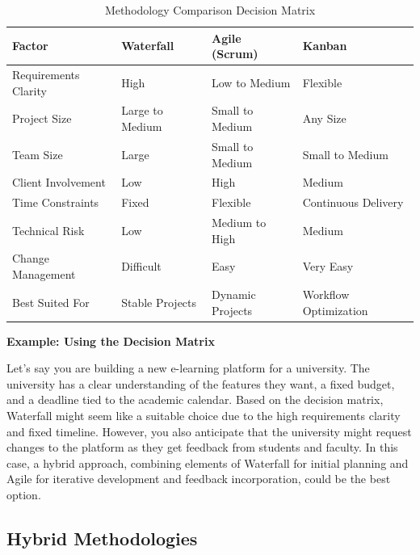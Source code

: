 \begin{table}[h!]
  \centering
  \begin{tabular}{p{3.5cm}|p{3.5cm}|p{3.5cm}|p{3.5cm}}
    \hline
    \textbf{Factor}      & \textbf{Waterfall} & \textbf{Agile (Scrum)} & \textbf{Kanban}       \\
    \hline
    Requirements Clarity & High               & Low to Medium          & Flexible              \\
    \hline
    Project Size         & Large to Medium    & Small to Medium        & Any Size              \\
    \hline
    Team Size            & Large              & Small to Medium        & Small to Medium       \\
    \hline
    Client Involvement   & Low                & High                   & Medium                \\
    \hline
    Time Constraints     & Fixed              & Flexible               & Continuous Delivery   \\
    \hline
    Technical Risk       & Low                & Medium to High         & Medium                \\
    \hline
    Change Management    & Difficult          & Easy                   & Very Easy             \\
    \hline
    Best Suited For      & Stable Projects    & Dynamic Projects       & Workflow Optimization \\
    \hline
  \end{tabular}
  \caption{Methodology Comparison Decision Matrix}
\end{table}

\textbf{Example: Using the Decision Matrix}

Let's say you are building a new e-learning platform for a university. The
university has a clear understanding of the features they want, a fixed budget,
and a deadline tied to the academic calendar. Based on the decision matrix,
Waterfall might seem like a suitable choice due to the high requirements
clarity and fixed timeline. However, you also anticipate that the university
might request changes to the platform as they get feedback from students and
faculty. In this case, a hybrid approach, combining elements of Waterfall for
initial planning and Agile for iterative development and feedback
incorporation, could be the best option.

\subsection{Hybrid Methodologies}

